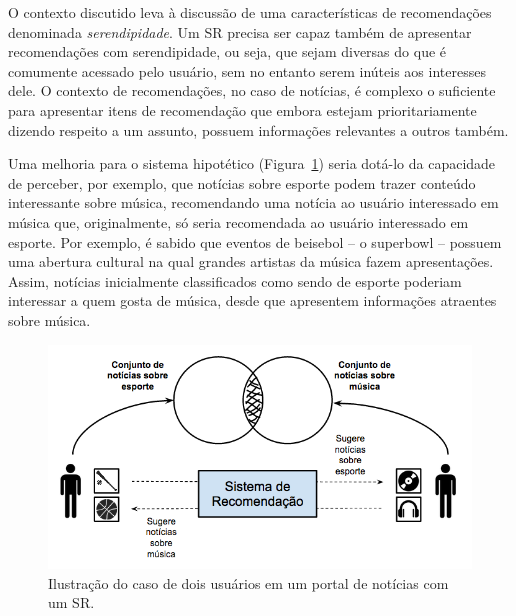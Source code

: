 \documentclass[normaltoc, espacoumemeio, pnumromarab,ruledheader]{abnt}
\begin{document}
O contexto discutido leva à discussão de uma características de recomendações denominada \textit{serendipidade}. Um SR precisa ser capaz também de apresentar recomendações com serendipidade, ou seja, que sejam diversas do que é comumente acessado pelo usuário, sem no entanto serem inúteis aos interesses dele. O contexto de recomendações, no caso de notícias, é complexo o suficiente para apresentar itens de recomendação que embora estejam prioritariamente dizendo respeito a um assunto, possuem informações relevantes a outros também. 


Uma melhoria para o sistema hipotético (Figura~\ref{fig:story}) seria dotá-lo da capacidade de perceber, por exemplo, que notícias sobre esporte podem trazer conteúdo interessante sobre música, recomendando uma notícia ao usuário interessado em música que, originalmente, só seria recomendada ao usuário interessado em esporte. Por exemplo, é sabido que eventos de beisebol -- o superbowl -- possuem uma abertura cultural na qual grandes artistas da música fazem apresentações. Assim, notícias inicialmente classificados como sendo de esporte poderiam interessar a quem gosta de música, desde que apresentem informações atraentes sobre música. %


\begin{figure}[h]
\centering
\includegraphics[width=120mm]{img/story.png}
\caption{Ilustração do caso de dois usuários em um portal de notícias com um SR.}
\label{fig:story}
\end{figure}
\end{document}
